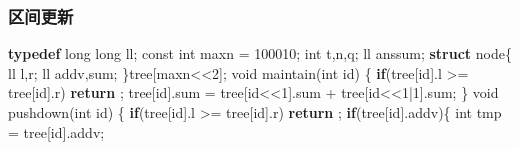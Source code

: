 \documentclass[
]{article}
\newenvironment{Shaded}{}{}
\newcommand{\AttributeTok}[1]{\textcolor[rgb]{0.49,0.56,0.16}{#1}}
\newcommand{\ControlFlowTok}[1]{\textcolor[rgb]{0.00,0.44,0.13}{\textbf{#1}}}
\newcommand{\DataTypeTok}[1]{\textcolor[rgb]{0.56,0.13,0.00}{#1}}
\newcommand{\DecValTok}[1]{\textcolor[rgb]{0.25,0.63,0.44}{#1}}
\newcommand{\KeywordTok}[1]{\textcolor[rgb]{0.00,0.44,0.13}{\textbf{#1}}}
\newcommand{\NormalTok}[1]{#1}
\newcommand{\OperatorTok}[1]{\textcolor[rgb]{0.40,0.40,0.40}{#1}}
\begin{document}
\hypertarget{ux533aux95f4ux66f4ux65b0}{%
\subsubsection{区间更新}\label{ux533aux95f4ux66f4ux65b0}}

\begin{Shaded}
\begin{Highlighting}[]
\KeywordTok{typedef} \DataTypeTok{long} \DataTypeTok{long}\NormalTok{ ll}\OperatorTok{;}  
\AttributeTok{const} \DataTypeTok{int}\NormalTok{ maxn }\OperatorTok{=} \DecValTok{100010}\OperatorTok{;}  
\DataTypeTok{int}\NormalTok{ t}\OperatorTok{,}\NormalTok{n}\OperatorTok{,}\NormalTok{q}\OperatorTok{;}  
\NormalTok{ll anssum}\OperatorTok{;}  
\KeywordTok{struct}\NormalTok{ node}\OperatorTok{\{}  
\NormalTok{    ll l}\OperatorTok{,}\NormalTok{r}\OperatorTok{;}  
\NormalTok{    ll addv}\OperatorTok{,}\NormalTok{sum}\OperatorTok{;}  
\OperatorTok{\}}\NormalTok{tree}\OperatorTok{[}\NormalTok{maxn}\OperatorTok{\textless{}\textless{}}\DecValTok{2}\OperatorTok{];}  
\DataTypeTok{void}\NormalTok{ maintain}\OperatorTok{(}\DataTypeTok{int}\NormalTok{ id}\OperatorTok{)} \OperatorTok{\{}  
    \ControlFlowTok{if}\OperatorTok{(}\NormalTok{tree}\OperatorTok{[}\NormalTok{id}\OperatorTok{].}\NormalTok{l }\OperatorTok{\textgreater{}=}\NormalTok{ tree}\OperatorTok{[}\NormalTok{id}\OperatorTok{].}\NormalTok{r}\OperatorTok{)}  
        \ControlFlowTok{return} \OperatorTok{;}  
\NormalTok{    tree}\OperatorTok{[}\NormalTok{id}\OperatorTok{].}\NormalTok{sum }\OperatorTok{=}\NormalTok{ tree}\OperatorTok{[}\NormalTok{id}\OperatorTok{\textless{}\textless{}}\DecValTok{1}\OperatorTok{].}\NormalTok{sum }\OperatorTok{+}\NormalTok{ tree}\OperatorTok{[}\NormalTok{id}\OperatorTok{\textless{}\textless{}}\DecValTok{1}\OperatorTok{|}\DecValTok{1}\OperatorTok{].}\NormalTok{sum}\OperatorTok{;}  
\OperatorTok{\}}  
\DataTypeTok{void}\NormalTok{ pushdown}\OperatorTok{(}\DataTypeTok{int}\NormalTok{ id}\OperatorTok{)} \OperatorTok{\{}  
    \ControlFlowTok{if}\OperatorTok{(}\NormalTok{tree}\OperatorTok{[}\NormalTok{id}\OperatorTok{].}\NormalTok{l }\OperatorTok{\textgreater{}=}\NormalTok{ tree}\OperatorTok{[}\NormalTok{id}\OperatorTok{].}\NormalTok{r}\OperatorTok{)}  
        \ControlFlowTok{return} \OperatorTok{;}  
    \ControlFlowTok{if}\OperatorTok{(}\NormalTok{tree}\OperatorTok{[}\NormalTok{id}\OperatorTok{].}\NormalTok{addv}\OperatorTok{)\{}  
        \DataTypeTok{int}\NormalTok{ tmp }\OperatorTok{=}\NormalTok{ tree}\OperatorTok{[}\NormalTok{id}\OperatorTok{].}\NormalTok{addv}\OperatorTok{;}  

\end{Highlighting}
\end{Shaded}
\end{document}
